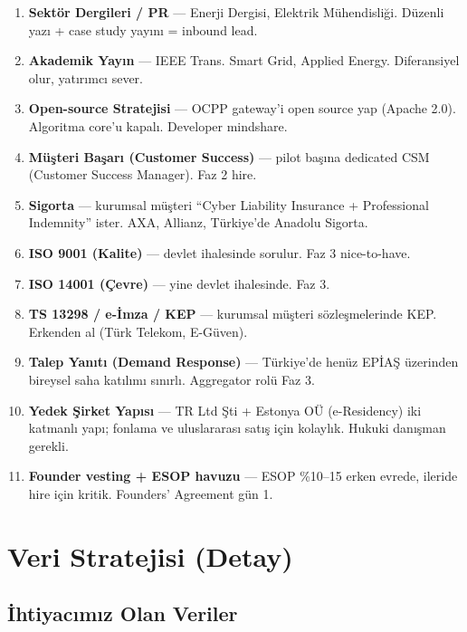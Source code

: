 \documentclass[11pt,a4paper]{article}
\begin{document}
\begin{enumerate}
    \item \textbf{Sektör Dergileri / PR} --- Enerji Dergisi, Elektrik Mühendisliği. Düzenli yazı + case study yayını = inbound lead.
    \item \textbf{Akademik Yayın} --- IEEE Trans. Smart Grid, Applied Energy. Diferansiyel olur, yatırımcı sever.
    \item \textbf{Open-source Stratejisi} --- OCPP gateway'i open source yap (Apache 2.0). Algoritma core'u kapalı. Developer mindshare.
    \item \textbf{Müşteri Başarı (Customer Success)} --- pilot başına dedicated CSM (Customer Success Manager). Faz 2 hire.
    \item \textbf{Sigorta} --- kurumsal müşteri ``Cyber Liability Insurance + Professional Indemnity'' ister. AXA, Allianz, Türkiye'de Anadolu Sigorta.
    \item \textbf{ISO 9001 (Kalite)} --- devlet ihalesinde sorulur. Faz 3 nice-to-have.
    \item \textbf{ISO 14001 (Çevre)} --- yine devlet ihalesinde. Faz 3.
    \item \textbf{TS 13298 / e-İmza / KEP} --- kurumsal müşteri sözleşmelerinde KEP. Erkenden al (Türk Telekom, E-Güven).
    \item \textbf{Talep Yanıtı (Demand Response)} --- Türkiye'de henüz EPİAŞ üzerinden bireysel saha katılımı sınırlı. Aggregator rolü Faz 3.
    \item \textbf{Yedek Şirket Yapısı} --- TR Ltd Şti + Estonya OÜ (e-Residency) iki katmanlı yapı; fonlama ve uluslararası satış için kolaylık. Hukuki danışman gerekli.
    \item \textbf{Founder vesting + ESOP havuzu} --- ESOP \%10--15 erken evrede, ileride hire için kritik. Founders' Agreement gün 1.
\end{enumerate}

\section{Veri Stratejisi (Detay)}

\subsection{İhtiyacımız Olan Veriler}
\end{document}
